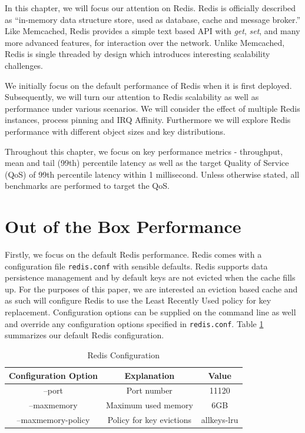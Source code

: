 In this chapter, we will focus our attention on Redis. Redis is officially described as ``in-memory data structure store, used as database, cache and message broker.'' \cite{sanfilippo2009redis} Like Memcached, Redis provides a simple text based API with \textit{get}, \textit{set}, and many more advanced features, for interaction over the network. Unlike Memcached, Redis is single threaded by design which introduces interesting scalability challenges.

We initially focus on the default performance of Redis when it is first deployed. Subsequently, we will turn our attention to Redis scalability as well as performance under various scenarios. We will consider the effect of multiple Redis instances, process pinning and IRQ Affinity. Furthermore we will explore Redis performance with different object sizes and key distributions.

Throughout this chapter, we focus on key performance metrics - throughput, mean and tail (99th) percentile latency as well as the target Quality of Service (QoS) of 99th percentile latency within 1 millisecond. Unless otherwise stated, all benchmarks are performed to target the QoS.


\section{Out of the Box Performance}
Firstly, we focus on the default Redis performance. Redis comes with a configuration file \texttt{redis.conf}\cite{RedisConfiguration} with sensible defaults. Redis supports data persistence management and by default keys are not evicted when the cache fills up. For the purposes of this paper, we are interested an eviction based cache and as such will configure Redis to use the Least Recently Used policy for key replacement. Configuration options can be supplied on the command line as well and override any configuration options specified in \texttt{redis.conf}. Table \ref{tab:r_redis_baseline_config} summarizes our default Redis configuration.

\begin{table}[h!]
\centering
\begin{tabular}{| c c c |}
 \hline
 Configuration Option & Explanation & Value\\ [0.5ex]
 \hline\hline

 --port & Port number & 11120 \\
 --maxmemory & Maximum used memory & 6GB \\
 --maxmemory-policy & Policy for key evictions & allkeys-lru \\

 \hline

\end{tabular}
\caption{Redis Configuration}
\label{tab:r_redis_baseline_config}
\end{table}

